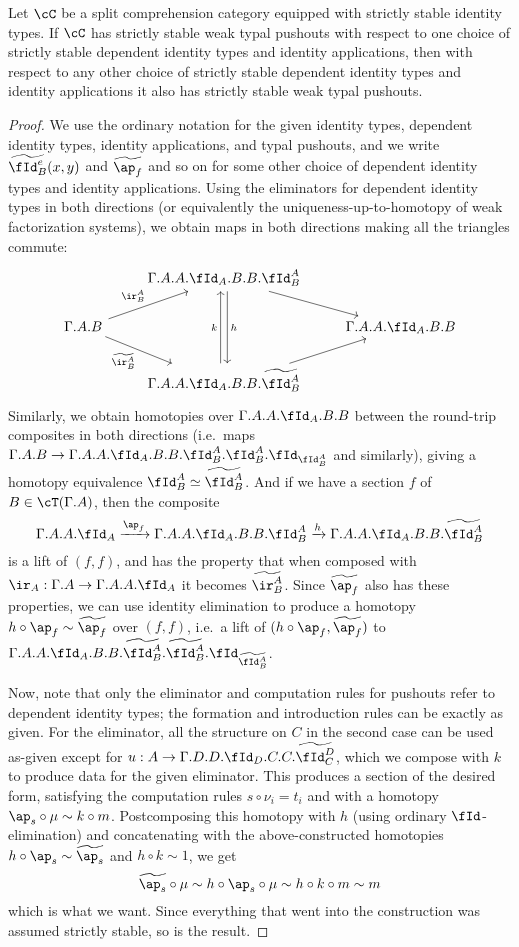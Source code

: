 \documentclass{amsart}
\let\C\cC
\let\T\cT
\let\r\ir
\let\Id\fId
\newcommand{\Idtwo}[2]{\widetilde{\Id^{#1}_{#2}}}
\newcommand{\rtwo}[2]{\widetilde{\r^{#1}_{#2}}}
\newcommand{\idovertwo}[4][]{\widetilde{\fId^{#4}_{#1}}(#2,#3)}
\newcommand{\aptwo}[1]{\widetilde{\ap_{#1}}}
\begin{document}
\begin{thm}
  Let $\C$ be a split comprehension category equipped with strictly stable identity types.
  If $\C$ has strictly stable weak typal pushouts with respect to one choice of strictly stable dependent identity types and identity applications, then with respect to any other choice of strictly stable dependent identity types and identity applications it also has strictly stable weak typal pushouts.
\end{thm}
\begin{proof}
  We use the ordinary notation for the given identity types, dependent identity types, identity applications, and typal pushouts, and we write $\idovertwo[B]{x}{y}{e}$ and $\aptwo{f}$ and so on for some other choice of dependent identity types and identity applications.
  Using the eliminators for dependent identity types in both directions (or equivalently the uniqueness-up-to-homotopy of weak factorization systems), we obtain maps in both directions making all the triangles commute:
  \[
  \begin{tikzcd}
    & \Gamma.A.A.\Id_A.B.B.\Id^A_B \ar[dr] \ar[dd,shift left,"h"]\\
    \Gamma.A.B \ar[ur,"{\r^A_B}"] \ar[dr,swap,"{\rtwo{A}{B}}"] && \Gamma.A.A.\Id_A.B.B\\
    & \Gamma.A.A.\Id_A.B.B.\Idtwo{A}{B} \ar[ur] \ar[uu,shift left,"k"]
  \end{tikzcd}
  \]
  Similarly, we obtain homotopies over $\Gamma.A.A.\Id_A.B.B$ between the round-trip composites in both directions (i.e.\ maps $\Gamma.A.B \to \Gamma.A.A.\Id_A.B.B.\Id^A_B.\Id^A_B.\Id_{\Id^A_B}$ and similarly), giving a homotopy equivalence $\Id^A_B \simeq \Idtwo{A}{B}$.
  And if we have a section $f$ of $B\in\T(\Gamma.A)$, then the composite
  \[ \Gamma.A.A.\Id_A \xto{\ap_f} \Gamma.A.A.\Id_A.B.B.\Id^A_B \xto{h} \Gamma.A.A.\Id_A.B.B.\Idtwo{A}{B} \]
  is a lift of $(f,f)$, and has the property that when composed with $\r_A : \Gamma.A \to \Gamma.A.A.\Id_A$ it becomes $\rtwo{A}{B}$.
  Since $\aptwo{f}$ also has these properties, we can use identity elimination to produce a homotopy $h\circ \ap_f \sim \aptwo{f}$ over $(f,f)$, i.e.\ a lift of $(h\circ \ap_f,\aptwo{f})$ to $\Gamma.A.A.\Id_A.B.B.\Idtwo{A}{B}.\Idtwo{A}{B}.\Id_{\Idtwo{A}{B}}$.

  Now, note that only the eliminator and computation rules for pushouts refer to dependent identity types; the formation and introduction rules can be exactly as given.
  For the eliminator, all the structure on $C$ in the second case can be used as-given except for $u:A\to \Gamma.D.D.\Id_D.C.C.\Idtwo{D}{C}$, which we compose with $k$ to produce data for the given eliminator.
  This produces a section of the desired form, satisfying the computation rules $s\circ \nu_i = t_i$ and with a homotopy $\ap_s\circ \mu \sim k\circ m$.
  Postcomposing this homotopy with $h$ (using ordinary $\Id$-elimination) and concatenating with the above-constructed homotopies $h\circ \ap_s \sim \aptwo{s}$ and $h\circ k \sim 1$, we get
  \[ \aptwo{s} \circ \mu \sim h\circ \ap_s \circ \mu \sim h\circ k\circ m \sim m \]
  which is what we want.
  Since everything that went into the construction was assumed strictly stable, so is the result.
\end{proof}
\end{document}
